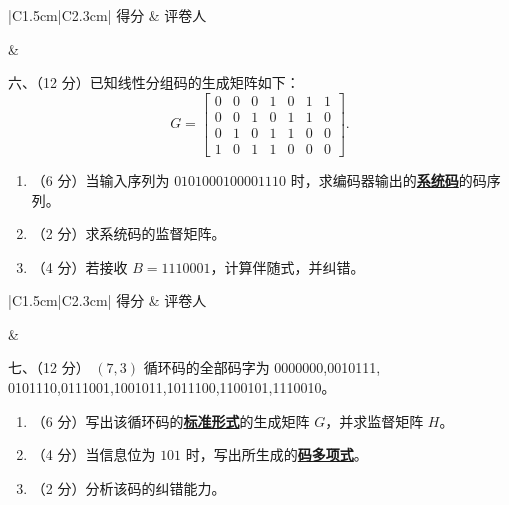 \documentclass[UTF8,a4paper,12pt]{ctexart}
\begin{document}
\noindent
\begin{minipage}[t]{0.26\textwidth}
\renewcommand{\arraystretch}{1.5}
\begin{tabular}{|C{1.5cm}|C{2.3cm}|}
\hline
得分 & 评卷人 \\
\hline
\rule{0pt}{0.8cm}&  \\
\hline
\end{tabular}
\end{minipage}
\hspace{0.02\textwidth}
\begin{minipage}[t]{0.68\textwidth}
\vspace{0.25cm}
{\heiti 六、（12 分）}已知线性分组码的生成矩阵如下：
\[
G=
\begin{bmatrix}
0&0&0&1&0&1&1\\
0&0&1&0&1&1&0\\
0&1&0&1&1&0&0\\
1&0&1&1&0&0&0
\end{bmatrix}.
\]
\end{minipage}
\begin{enumerate}[label=\arabic*., leftmargin=2em]
\item （6 分）当输入序列为 $0101000100001110$ 时，求编码器输出的\underline{\textbf{系统码}}的码序列。
\item （2 分）求系统码的监督矩阵。
\item （4 分）若接收 $B=1110001$，计算伴随式，并纠错。
\end{enumerate}

\newpage

\noindent
\begin{minipage}[t]{0.26\textwidth}
\renewcommand{\arraystretch}{1.5}
\begin{tabular}{|C{1.5cm}|C{2.3cm}|}
\hline
得分 & 评卷人 \\
\hline
\rule{0pt}{0.8cm}&  \\
\hline
\end{tabular}
\end{minipage}
\hspace{0.02\textwidth}
\begin{minipage}[t]{0.68\textwidth}
\vspace{0.25cm}
{\heiti 七、（12 分）} $(7,3)$ 循环码的全部码字为
0000000,0010111,
0101110,0111001,1001011,1011100,1100101,1110010。
\end{minipage}
\begin{enumerate}[label=\arabic*., leftmargin=2em]
\item （6 分）写出该循环码的\underline{\textbf{标准形式}}的生成矩阵 $G$，并求监督矩阵 $H$。
\item （4 分）当信息位为 $101$ 时，写出所生成的\underline{\textbf{码多项式}}。
\item （2 分）分析该码的纠错能力。
\end{enumerate}
\end{document}
